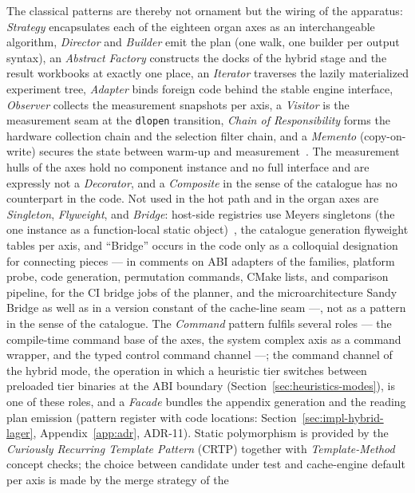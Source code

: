 \begin{nurlang}
The classical patterns are thereby not ornament but the wiring of the apparatus: \emph{Strategy}
encapsulates each of the eighteen organ axes as an interchangeable algorithm, \emph{Director} and
\emph{Builder} emit the plan (one walk, one builder per output syntax), an \emph{Abstract
Factory} constructs the docks of the hybrid stage and the result workbooks at exactly one place, an
\emph{Iterator} traverses the lazily materialized experiment tree, \emph{Adapter} binds foreign code
behind the stable engine interface, \emph{Observer} collects the measurement snapshots per axis, a
\emph{Visitor} is the measurement seam at the \texttt{dlopen} transition, \emph{Chain of Responsibility} forms the
hardware collection chain and the selection filter chain, and a \emph{Memento} (copy-on-write) secures
the state between warm-up and measurement~\cite{gamma1994patterns}. The measurement hulls of the axes hold
no component instance and no full interface and are expressly not a \emph{Decorator}, and a
\emph{Composite} in the sense of the catalogue has no counterpart in the code. Not used in the hot path
and in the organ axes are \emph{Singleton}, \emph{Flyweight}, and \emph{Bridge}: host-side registries
use Meyers singletons (the one instance as a function-local static
object)~\cite{meyers2005effective}, the catalogue generation flyweight tables per axis, and
\enquote{Bridge} occurs in the code only as a colloquial designation for connecting pieces ---
in comments on ABI adapters of the families, platform probe, code generation, permutation commands,
CMake lists, and comparison pipeline, for the CI bridge jobs of the planner, and the microarchitecture
Sandy Bridge as well as in a version constant of the cache-line seam ---, not as a pattern in the sense of the
catalogue. The \emph{Command} pattern
fulfils several roles --- the compile-time command base of the axes, the system complex axis
as a command wrapper, and the typed control command channel ---; the command channel of the hybrid mode,
the operation in which a heuristic tier switches between preloaded tier binaries at the ABI boundary
(Section~\ref{sec:heuristics-modes}), is one of these roles, and a \emph{Facade} bundles the
appendix generation and the reading plan emission (pattern register with code locations:
Section~\ref{sec:impl-hybrid-lager}, Appendix~\ref{app:adr}, ADR-11). Static polymorphism is
provided by the
\emph{Curiously Recurring Template Pattern} (CRTP) together with \emph{Template-Method} concept checks;
the choice between candidate under test and cache-engine default per axis is made by the merge strategy of the

\end{nurlang}
